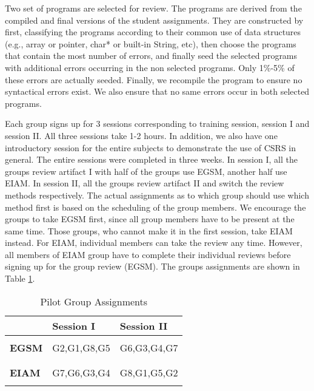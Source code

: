 Two set of programs are selected for review. The programs are derived 
from the compiled and final versions of the student
assignments. They are constructed by first, classifying the programs
according to their common 
use of  data structures (e.g., array or pointer, char* or  built-in
String, etc), then choose the programs that contain the most
number of errors, and finally seed the selected programs with
additional errors occurring in the non selected programs. Only 1\%-5\%
of these 
errors are actually seeded. Finally, we recompile the program to
ensure no syntactical errors exist. We also ensure that no same
errors occur in both selected programs.

Each group signs up for 3 sessions corresponding to training session,
session I and session II. All three sessions take 1-2 hours. In
addition, we also have one introductory session for the
entire subjects to demonstrate  the use of CSRS in general. The entire
sessions were completed in three weeks. In session I, all the groups
review artifact I with half of the groups use EGSM, another half
use EIAM. In session II, all the groups review artifact II and
switch the review methods respectively. The actual assignments as to
which group should use which method first is based on the scheduling
of the group members. We encourage the groups to take EGSM first,
since all group members have to be present at the same time. Those
groups, who cannot make it in the first session, take EIAM instead.
For EIAM, individual members can take the review any time.
However, all members of EIAM group have to complete their individual
reviews before signing up for the group review (EGSM).
The groups assignments are shown in Table \ref{pilot-groups}.

\begin{table}[h]
  \begin{center}
    \begin{tabular} {|l|l|l|}
      \hline
      & {\bf Session I} & {\bf Session II}\\
      \hline
      & & \\
      {\bf EGSM} & G2,G1,G8,G5 & G6,G3,G4,G7 \\
      & & \\
      \hline
      & & \\
      {\bf EIAM} & G7,G6,G3,G4 & G8,G1,G5,G2 \\
      & &  \\
      \hline
     \end{tabular}
  \end{center}
  \caption{Pilot Group Assignments}
  \label{pilot-groups}
\end{table}

